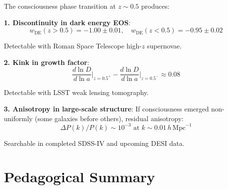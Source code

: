 \begin{proposition}\label{prop:phase-transition-signatures}
The consciousness phase transition at $z \sim 0.5$ produces:

\textbf{1. Discontinuity in dark energy EOS}:
\begin{equation}
w_{\text{DE}}(z > 0.5) = -1.00 \pm 0.01, \quad w_{\text{DE}}(z < 0.5) = -0.95 \pm 0.02
\end{equation}

Detectable with Roman Space Telescope high-$z$ supernovae\cite{roman2015}.

\textbf{2. Kink in growth factor}:
\begin{equation}
\frac{d \ln D}{d \ln a}\Big|_{z=0.5^+} - \frac{d \ln D}{d \ln a}\Big|_{z=0.5^-} \approx 0.08
\end{equation}

Detectable with LSST weak lensing tomography\cite{lsst2009}.

\textbf{3. Anisotropy in large-scale structure}:
If consciousness emerged non-uniformly (some galaxies before others), residual anisotropy:
\begin{equation}
\Delta P(k) / P(k) \sim 10^{-3} \text{ at } k \sim 0.01 \, h \, \text{Mpc}^{-1}
\end{equation}

Searchable in completed SDSS-IV\cite{sdss2018} and upcoming DESI\cite{desi2016} data.
\end{proposition}

\section{Pedagogical Summary}

